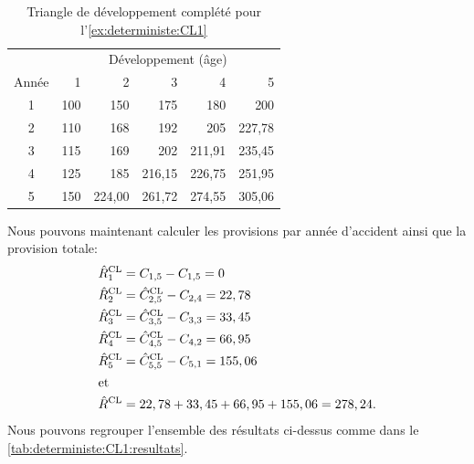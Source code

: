 \begin{exemple}
  \begin{table}
    \centering
    \caption{Triangle de développement complété pour
      l'\autoref{ex:deterministe:CL1}}
    \label{tab:deterministe:CL1:complet}
    \begin{tabular}{crrrrr}
      \toprule
      & \multicolumn{5}{c}{Développement (âge)} \\
      Année & 1 & 2 & 3 & 4 & 5 \\
      \midrule
      1 & 100 & 150    & 175    & 180    & 200    \\
      2 & 110 & 168    & 192    & 205    & 227,78 \\
      3 & 115 & 169    & 202    & 211,91 & 235,45 \\
      4 & 125 & 185    & 216,15 & 226,75 & 251,95 \\
      5 & 150 & 224,00 & 261,72 & 274,55 & 305,06 \\
      \bottomrule
    \end{tabular}
  \end{table}

  Nous pouvons maintenant calculer les provisions par année d'accident
  ainsi que la provision totale:
  \begin{align*}
    \hat{R}_1^{\text{CL}}
    &= C_{1, 5} - C_{1, 5} = 0 \\
    \hat{R}_2^{\text{CL}}
    &= \hat{C}_{2, 5}^{\text{CL}} - C_{2, 4} = 22,78 \\
    \hat{R}_3^{\text{CL}}
    &= \hat{C}_{3, 5}^{\text{CL}} - C_{3, 3} = 33,45 \\
    \hat{R}_4^{\text{CL}}
    &= \hat{C}_{4, 5}^{\text{CL}} - C_{4, 2} = 66,95 \\
    \hat{R}_5^{\text{CL}}
    &= \hat{C}_{5, 5}^{\text{CL}} - C_{5, 1} = 155,06 \\
    \intertext{et}
    \hat{R}^{\text{CL}}
    &= 22,78 + 33,45 + 66,95 + 155,06 = 278,24.
  \end{align*}
  Nous pouvons regrouper l'ensemble des résultats ci-dessus comme dans
  le \autoref{tab:deterministe:CL1:resultats}.


\end{exemple}
